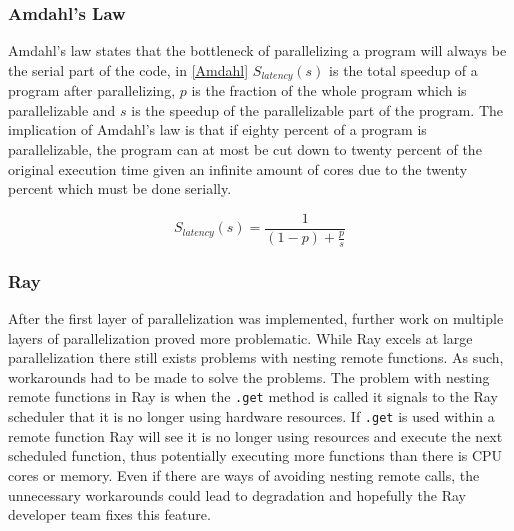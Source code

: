 \documentclass[12pt, a4paper]{article}
\begin{document}

\subsubsection{Amdahl's Law}

Amdahl's law states that the bottleneck of parallelizing a program will always be the serial part of the code, in \cref{Amdahl} $S_{latency}(s)$ is the total speedup of a program after parallelizing, $p$ is the fraction of the whole program which is parallelizable and $s$ is the speedup of the parallelizable part of the program.
The implication of Amdahl's law is that if eighty percent of a program is parallelizable, the program can at most be cut down to twenty percent of the original execution time given an infinite amount of cores due to the twenty percent which must be done serially.

\begin{equation}\label{Amdahl}
    S_{latency}(s) = \frac{1}{(1-p) + \frac{p}{s}}
\end{equation}

\subsubsection{Ray}\label{RayNesting}

After the first layer of parallelization was implemented, further work on multiple layers of parallelization proved more problematic.
While Ray excels at large parallelization there still exists problems with nesting remote functions. 
As such, workarounds had to be made to solve the problems.
The problem with nesting remote functions in Ray is when the \texttt{.get} method is called it signals to the Ray scheduler that it is no longer using hardware resources.
If \texttt{.get} is used within a remote function Ray will see it is no longer using resources and execute the next scheduled function, thus potentially executing more functions than there is CPU cores or memory.
Even if there are ways of avoiding nesting remote calls, the unnecessary workarounds could lead to degradation and hopefully the Ray developer team fixes this feature.
\end{document}
